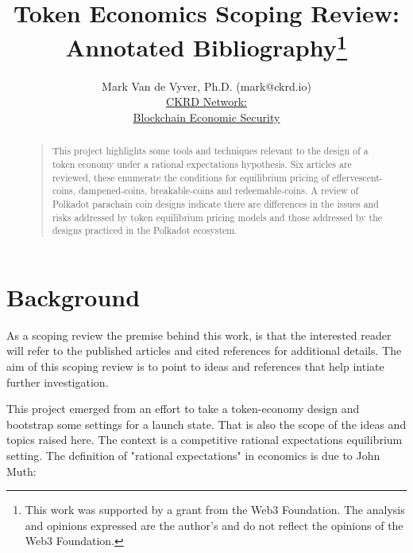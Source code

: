 \documentclass[11pt]{article}
\def \ckrdurl{https://ckrd.io/}
\begin{document}


\title{Token Economics Scoping Review:\\Annotated Bibliography\footnote{This work was supported by a grant from the Web3 Foundation. The analysis and opinions expressed are the author's and do not reflect the opinions of the Web3 Foundation.}}
\author{Mark Van de Vyver, Ph.D. (mark@ckrd.io)\\
\href{\ckrdurl}{CKRD Network:}\\
\href{\ckrdurl}{Blockchain Economic Security}\\
}
\maketitle
\begin{abstract}
\begin{quote}
This project highlights some tools and techniques relevant to the design of a token economy under a rational expectations hypothesis.  Six articles are reviewed, these enumerate the conditions for equilibrium pricing of effervescent-coins, dampened-coins, breakable-coins and redeemable-coins. A review of Polkadot parachain coin designs indicate there are differences in the issues and risks addressed by token equilibrium pricing models and those addressed by the designs practiced in the Polkadot ecosystem.
\end{quote}
\end{abstract}

\tableofcontents

\section{Background}

As a scoping review the premise behind this work, is that the interested reader will refer to the published articles and cited references for additional details.  The aim of this scoping review is to point to ideas and references that help intiate further investigation.

This project emerged from an effort to take a token-economy design and bootstrap some settings for a launch state. That is also the scope of the ideas and topics raised here.  The context is a competitive rational expectations equilibrium setting.  The definition of "rational expectations" in economics is due to John Muth\autocite{muth61}:
\end{document}
